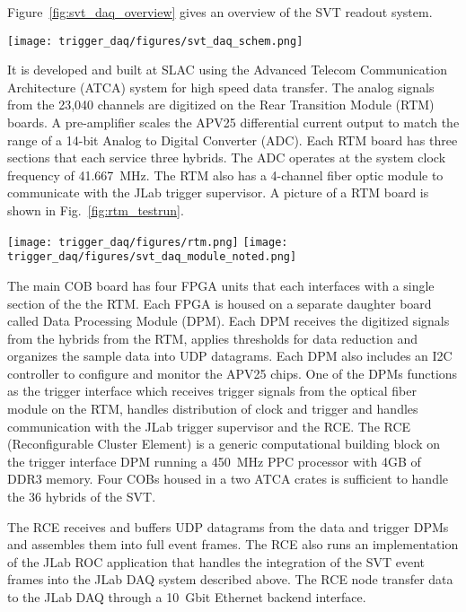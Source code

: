 Figure~\ref{fig:svt_daq_overview} gives an overview of the SVT readout system. 
 \begin{figure*}[t]
\texttt{[image: trigger\_daq/figures/svt\_daq\_schem.png]}
\caption{\small{Schematic block diagram of the SVT data acquisition system.}}
\label{fig:svt_daq_overview}
\end{figure*}
It is developed and built at SLAC using the Advanced Telecom 
Communication Architecture (ATCA) system for high speed data transfer. The analog signals 
from the 23,040 channels are digitized on the Rear Transition Module (RTM) boards. A 
pre-amplifier scales the APV25 differential current output to match the range of a 14-bit 
Analog to Digital Converter (ADC). Each RTM board has three sections that each service 
three hybrids. The ADC operates at the system clock frequency of 41.667~MHz. The RTM 
also has a 4-channel fiber optic module to communicate with the JLab trigger supervisor. 
A picture of a RTM board is shown in Fig.~\ref{fig:rtm_testrun}.
 \begin{figure*}[t]
\texttt{[image: trigger\_daq/figures/rtm.png]}
\texttt{[image: trigger\_daq/figures/svt\_daq\_module\_noted.png]}
\caption{\small{Picture of a RTM (top) and COB board (bottom) 
used in the HPS test run 2012.}}
\label{fig:rtm_testrun}
\end{figure*}
The main COB board has four FPGA units that each interfaces with a single section of the 
the RTM.  Each FPGA is housed on a separate daughter board called 
Data Processing Module (DPM). Each DPM receives the digitized signals from the hybrids 
from the RTM, applies thresholds for data reduction and organizes the sample data 
into UDP datagrams. Each DPM also includes an I2C controller to configure and monitor the 
APV25 chips. One of the DPMs functions as the trigger interface which receives trigger 
signals from the optical fiber module on the RTM, handles distribution of clock and trigger 
and handles communication with the JLab trigger supervisor and the RCE. The 
RCE (Reconfigurable Cluster Element) is a generic computational building block 
on the trigger interface DPM running a 450~MHz PPC processor with 4GB of DDR3 
memory. Four COBs housed in a two ATCA crates is sufficient to handle 
the 36 hybrids of the SVT.

The RCE receives and buffers UDP datagrams from the data and trigger DPMs and
 assembles them into full event frames. The RCE also runs an implementation of the JLab ROC application that handles the integration of the SVT event frames into the JLab DAQ 
 system described above. The RCE node transfer data to the JLab DAQ  
 through a 10~Gbit Ethernet backend interface. 

